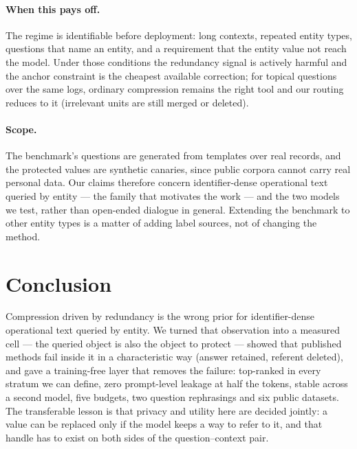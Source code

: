 \documentclass[conference]{IEEEtran}
\begin{document}
\paragraph{When this pays off.}
The regime is identifiable before deployment: long contexts, repeated entity types, questions
that name an entity, and a requirement that the entity value not reach the model. Under those
conditions the redundancy signal is actively harmful and the anchor constraint is the cheapest
available correction; for topical questions over the same logs, ordinary compression remains
the right tool and our routing reduces to it (irrelevant units are still merged or deleted).

\paragraph{Scope.}
The benchmark's questions are generated from templates over real records, and the protected
values are synthetic canaries, since public corpora cannot carry real personal data. Our claims
therefore concern identifier-dense operational text queried by entity --- the family that
motivates the work --- and the two models we test, rather than open-ended dialogue in general.
Extending the benchmark to other entity types is a matter of adding label sources, not of
changing the method.

\section{Conclusion}
\label{sec:concl}

Compression driven by redundancy is the wrong prior for identifier-dense operational text
queried by entity. We turned that observation into a measured cell --- the queried object is
also the object to protect --- showed that published methods fail inside it in a characteristic
way (answer retained, referent deleted), and gave a training-free layer that removes the
failure: top-ranked in every stratum we can define, zero prompt-level leakage at half the
tokens, stable across a second model, five budgets, two question rephrasings and six public
datasets. The transferable lesson is that privacy and utility here are decided jointly: a value
can be replaced only if the model keeps a way to refer to it, and that handle has to exist on
both sides of the question--context pair.
\end{document}
